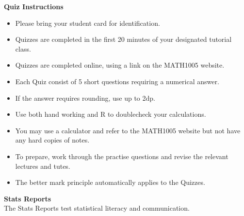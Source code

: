 \documentclass[bigtut]{quiz}\usepackage[]{graphicx}\usepackage[]{color}
\begin{document}
\begin{tutorial}
\vspace{.5cm}
{\bf Quiz Instructions}
\begin{itemize}
\item Please bring your student card for identification.  \\ 
\item Quizzes are completed in the first 20 minutes of your designated tutorial class.  \\ 
\item Quizzes are completed online, using a link on the MATH1005 website.  \\ 
\item Each Quiz consist of 5 short questions requiring a numerical answer. \\
\item If the answer requires rounding, use up to 2dp.  \\
\item Use both hand working and R to doublecheck your calculations. \\ 
\item You may use a calculator and refer to the MATH1005 website but not have any hard copies of notes.  \\
\item To prepare, work through the practise questions and revise the relevant lectures and tutes. \\
\item The better mark principle automatically applies to the Quizzes. 
\end{itemize}

\newpage
{\bf Stats Reports} \\
The Stats Reports test statistical literacy and communication.   \\



\end{tutorial}
\end{document}
